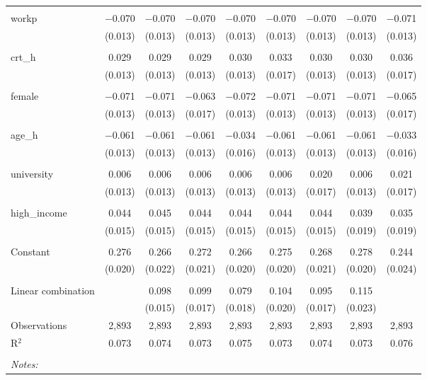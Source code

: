 \begin{table}[!htbp]
\begin{tabular}{@{\extracolsep{5pt}}lcccccccc}
  & & & & & & & & \\ 
 workp & $-$0.070 & $-$0.070 & $-$0.070 & $-$0.070 & $-$0.070 & $-$0.070 & $-$0.070 & $-$0.071 \\ 
  & (0.013) & (0.013) & (0.013) & (0.013) & (0.013) & (0.013) & (0.013) & (0.013) \\ 
  & & & & & & & & \\ 
 crt\_h & 0.029 & 0.029 & 0.029 & 0.030 & 0.033 & 0.030 & 0.030 & 0.036 \\ 
  & (0.013) & (0.013) & (0.013) & (0.013) & (0.017) & (0.013) & (0.013) & (0.017) \\ 
  & & & & & & & & \\ 
 female & $-$0.071 & $-$0.071 & $-$0.063 & $-$0.072 & $-$0.071 & $-$0.071 & $-$0.071 & $-$0.065 \\ 
  & (0.013) & (0.013) & (0.017) & (0.013) & (0.013) & (0.013) & (0.013) & (0.017) \\ 
  & & & & & & & & \\ 
 age\_h & $-$0.061 & $-$0.061 & $-$0.061 & $-$0.034 & $-$0.061 & $-$0.061 & $-$0.061 & $-$0.033 \\ 
  & (0.013) & (0.013) & (0.013) & (0.016) & (0.013) & (0.013) & (0.013) & (0.016) \\ 
  & & & & & & & & \\ 
 university & 0.006 & 0.006 & 0.006 & 0.006 & 0.006 & 0.020 & 0.006 & 0.021 \\ 
  & (0.013) & (0.013) & (0.013) & (0.013) & (0.013) & (0.017) & (0.013) & (0.017) \\ 
  & & & & & & & & \\ 
 high\_income & 0.044 & 0.045 & 0.044 & 0.044 & 0.044 & 0.044 & 0.039 & 0.035 \\ 
  & (0.015) & (0.015) & (0.015) & (0.015) & (0.015) & (0.015) & (0.019) & (0.019) \\ 
  & & & & & & & & \\ 
 Constant & 0.276 & 0.266 & 0.272 & 0.266 & 0.275 & 0.268 & 0.278 & 0.244 \\ 
  & (0.020) & (0.022) & (0.021) & (0.020) & (0.020) & (0.021) & (0.020) & (0.024) \\ 
  & & & & & & & & \\ 
Linear combination &   & 0.098 & 0.099 & 0.079 & 0.104 & 0.095 & 0.115 &  \\ 
 &  & (0.015) & (0.017) & (0.018) & (0.020) & (0.017) & (0.023) &  \\ 
Observations & 2,893 & 2,893 & 2,893 & 2,893 & 2,893 & 2,893 & 2,893 & 2,893 \\ 
R$^{2}$ & 0.073 & 0.074 & 0.073 & 0.075 & 0.073 & 0.074 & 0.073 & 0.076 \\ 
\hline \\[-1.8ex] 
\textit{Notes:} & \multicolumn{8}{l}{} \\ 
\end{tabular} 
\end{table} 
